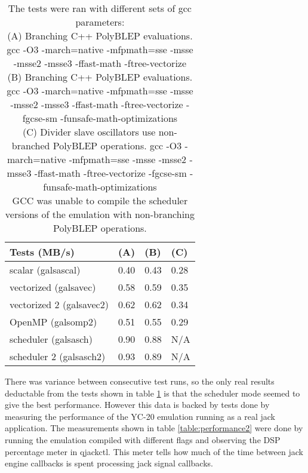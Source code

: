 \documentclass[11pt,a4paper]{article}
\begin{document}
\begin{table}[h]
 \begin{center}
\begin{tabular}{|l|l|l|l|}

      \hline
      Tests (MB/s)             & (A)  & (B)  & (C) \\
      \hline\hline
      scalar (galsascal)       & 0.40 & 0.43 & 0.28 \\
      vectorized (galsavec)    & 0.58 & 0.59 & 0.35 \\
      vectorized 2 (galsavec2) & 0.62 & 0.62 & 0.34 \\
      OpenMP (galsomp2)        & 0.51 & 0.55 & 0.29 \\
      scheduler (galsasch)     & 0.90 & 0.88 & N/A \\
      scheduler 2 (galsasch2)  & 0.93 & 0.89 & N/A \\
      \hline

\end{tabular}
\caption{The tests were ran with different sets of gcc parameters: \\
(A) Branching C++ PolyBLEP evaluations. gcc -O3 -march=native -mfpmath=sse -msse -msse2 -msse3 -ffast-math -ftree-vectorize \\
(B) Branching C++ PolyBLEP evaluations. gcc -O3 -march=native -mfpmath=sse -msse -msse2 -msse3 -ffast-math -ftree-vectorize -fgcse-sm  -funsafe-math-optimizations \\
(C) Divider slave oscillators use non-branched PolyBLEP operations. gcc -O3 -march=native -mfpmath=sse -msse -msse2 -msse3 -ffast-math -ftree-vectorize -fgcse-sm  -funsafe-math-optimizations \\
GCC was unable to compile the scheduler versions of the emulation with non-branching PolyBLEP operations.\\
}\label{table:performance}
 \end{center}
\end{table}

There was variance between consecutive test runs, so the only real results deductable from the tests shown in table \ref{table:performance} is that the scheduler mode seemed to give the best performance. However this data is backed by tests done by measuring the performance of the YC-20 emulation running as a real jack application. The measurements shown in table \ref{table:performance2} were done by running the emulation compiled with different flags and observing the DSP percentage meter in qjackctl. This meter tells how much of the time between jack engine callbacks is spent processing jack signal callbacks.
\end{document}
